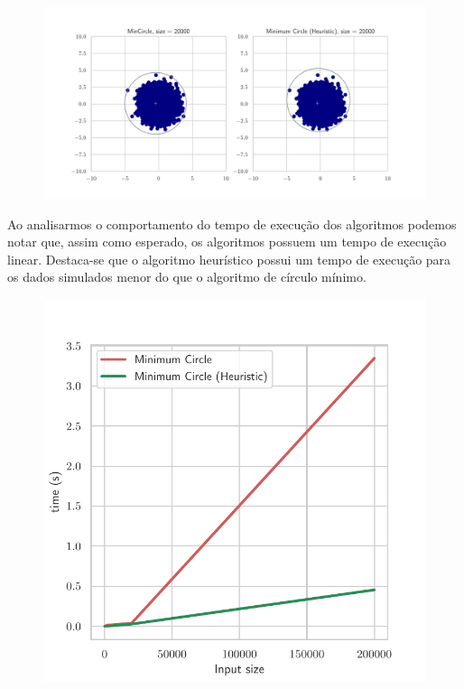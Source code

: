 \documentclass{article}
\begin{document}
\begin{figure}[H]
  \centering
  \includegraphics[scale=0.6]{figures/simulation/plot_min_circle_20000_points.pdf}
\end{figure}

Ao analisarmos o comportamento do tempo de execução dos algoritmos podemos notar que, assim como esperado, os algoritmos possuem um tempo de execução linear. Destaca-se que o algoritmo heurístico possui um tempo de execução para os dados simulados menor do que o algoritmo de círculo mínimo. 

\begin{figure}[H]
  \centering
  \includegraphics[scale=0.7]{figures/simulation/time.pdf}
\end{figure}
\end{document}
